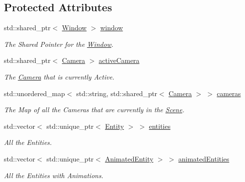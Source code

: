 \subsection*{Protected Attributes}
\begin{DoxyCompactItemize}
\item 
std\+::shared\+\_\+ptr$<$ \mbox{\hyperlink{class_window}{Window}} $>$ \mbox{\hyperlink{classpiolot_1_1_scene_a250749bf646c4ab0349bd98e515b0d5b}{window}}
\begin{DoxyCompactList}\small\item\em The Shared Pointer for the \mbox{\hyperlink{class_window}{Window}}. \end{DoxyCompactList}\item 
std\+::shared\+\_\+ptr$<$ \mbox{\hyperlink{classpiolot_1_1_camera}{Camera}} $>$ \mbox{\hyperlink{classpiolot_1_1_scene_a980ee452f49233f7b95fa4643e383ae9}{active\+Camera}}
\begin{DoxyCompactList}\small\item\em The \mbox{\hyperlink{classpiolot_1_1_camera}{Camera}} that is currently Active. \end{DoxyCompactList}\item 
std\+::unordered\+\_\+map$<$ std\+::string, std\+::shared\+\_\+ptr$<$ \mbox{\hyperlink{classpiolot_1_1_camera}{Camera}} $>$ $>$ \mbox{\hyperlink{classpiolot_1_1_scene_a03ce910c0242bb786e797d54bbffd54f}{cameras}}
\begin{DoxyCompactList}\small\item\em The Map of all the Cameras that are currently in the \mbox{\hyperlink{classpiolot_1_1_scene}{Scene}}. \end{DoxyCompactList}\item 
std\+::vector$<$ std\+::unique\+\_\+ptr$<$ \mbox{\hyperlink{classpiolot_1_1_entity}{Entity}} $>$ $>$ \mbox{\hyperlink{classpiolot_1_1_scene_ac85cd14260516aaaac3dacab4138a662}{entities}}
\begin{DoxyCompactList}\small\item\em All the Entities. \end{DoxyCompactList}\item 
std\+::vector$<$ std\+::unique\+\_\+ptr$<$ \mbox{\hyperlink{classpiolot_1_1_animated_entity}{Animated\+Entity}} $>$ $>$ \mbox{\hyperlink{classpiolot_1_1_scene_a6253e5cbedc67830e76d6da04c0b4371}{animated\+Entities}}
\begin{DoxyCompactList}\small\item\em All the Entities with Animations. \end{DoxyCompactList}\item 

\end{DoxyCompactItemize}
